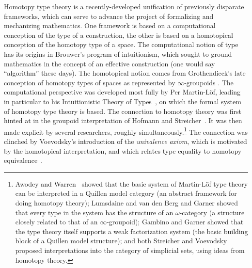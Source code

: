 \documentclass[11pt]{article}
\theoremstyle{remark}
\theoremstyle{definition}
\begin{document}
\noindent Homotopy type theory is a recently-developed unification of previously disparate frameworks, which can serve
to advance the project of formalizing and mechanizing mathematics.  One framework is based on a computational conception
of the type of a construction, the other is based on a homotopical conception of the homotopy type of a space.  
The computational notion of type has its origins in Brouwer's program of intuitionism, which sought to ground
mathematics in the concept of an effective construction (one would say ``algorithm'' these days).  The homotopical
notion comes from Grothendieck's late conception of  homotopy types of spaces as represented by $\infty$-groupoids
\cite{GrothPS}.  The computational perspective was developed most fully by Per Martin-L\"{o}f, leading in particular to
his Intuitionistic Theory of Types~\cite{mltt}, on which the formal system of homotopy type theory is based.  The
connection to homotopy theory was first hinted at in the groupoid interpretation of Hofmann and
Streicher~\cite{HS,HofmannM:gromtt}.  It was then made explicit by several researchers, roughly
simultaneously.\footnote{%
  Awodey and Warren~\cite{AW} showed that the basic system of Martin-L\"{o}f type theory can be interpreted in a Quillen
  model category (an abstract framework for doing homotopy theory); Lumsdaine \cite{L} and van den Berg and Garner
  \cite{vandenBergB:typwg} showed that every type in the system has the structure of an $\omega$-category (a structure
  closely related to that of an $\infty$-groupoid); Gambino and Garner \cite{GG} showed that the type theory itself
  supports a weak factorization system (the basic building block of a Quillen model structure); and both Streicher
  \cite{StreicherNote} and Voevodsky \cite{VVnote} proposed interpretations into the category of simplicial sets, using
  ideas from homotopy theory.}  The connection was clinched by Voevodsky's introduction of the \emph{univalence axiom},
which is motivated by the homotopical interpretation, and which relates type equality to homotopy equivalence~\cite{KLV,APW}.

\end{document}
